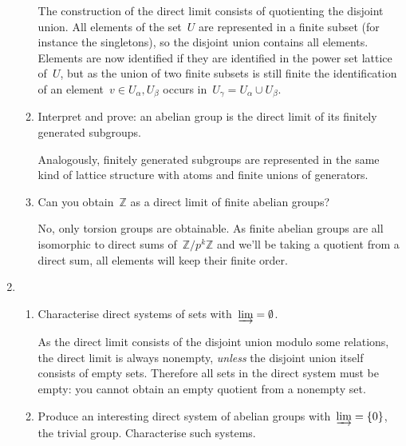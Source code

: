 \documentclass[a4paper,11pt,oneside,openany,article]{memoir}
\begin{document}
\begin{enumerate}
\begin{enumerate}
        \begin{solution}
          The construction of the direct limit consists of quotienting the disjoint union. All elements of the set~$U$ are represented in a finite subset (for instance the singletons), so the disjoint union contains all elements. Elements are now identified if they are identified in the power set lattice of~$U$, but as the union of two finite subsets is still finite the identification of an element~$v\in U_\alpha,U_\beta$ occurs in~$U_\gamma=U_\alpha\cup U_\beta$.
        \end{solution}

      \item Interpret and prove: an abelian group is the direct limit of its finitely generated subgroups.

        \begin{solution}
          Analogously, finitely generated subgroups are represented in the same kind of lattice structure with atoms and finite unions of generators. 
        \end{solution}

      \item Can you obtain~$\mathbb{Z}$ as a direct limit of finite abelian groups?

        \begin{solution}
          No, only torsion groups are obtainable. As finite abelian groups are all isomorphic to direct sums of~$\mathbb{Z}/p^k\mathbb{Z}$ and we'll be taking a quotient from a direct sum, all elements will keep their finite order.
        \end{solution}
    \end{enumerate}

  \item
    \begin{enumerate}
      \item Characterise direct systems of sets with~$\varinjlim=\emptyset$.

        \begin{solution}
          As the direct limit consists of the disjoint union modulo some relations, the direct limit is always nonempty, \emph{unless} the disjoint union itself consists of empty sets. Therefore all sets in the direct system must be empty: you cannot obtain an empty quotient from a nonempty set.
        \end{solution}

      \item Produce an interesting direct system of abelian groups with~$\varinjlim=\left\{ 0 \right\}$, the trivial group. Characterise such systems.


\end{enumerate}
\end{enumerate}
\end{document}
